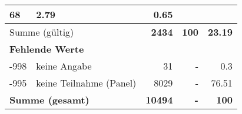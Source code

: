 \begin{longtable}{lXrrr}
       \num{68} &
       \num[round-mode=places,round-precision=2]{2.79} &
         \num[round-mode=places,round-precision=2]{0.65} \\
     \midrule
     \multicolumn{2}{l}{Summe (gültig)} &
       \textbf{\num{2434}} &
     \textbf{\num{100}} &
       \textbf{\num[round-mode=places,round-precision=2]{23.19}} \\
     \multicolumn{5}{l}{\textbf{Fehlende Werte}}\\
       -998 &
       keine Angabe &
         \num{31} &
        - &
         \num[round-mode=places,round-precision=2]{0.3} \\
       -995 &
       keine Teilnahme (Panel) &
         \num{8029} &
        - &
         \num[round-mode=places,round-precision=2]{76.51} \\
     \midrule
     \multicolumn{2}{l}{\textbf{Summe (gesamt)}} &
          \textbf{\num{10494}} &
        \textbf{-} &
        \textbf{\num{100}} \\
     \bottomrule
     \end{longtable}
     
